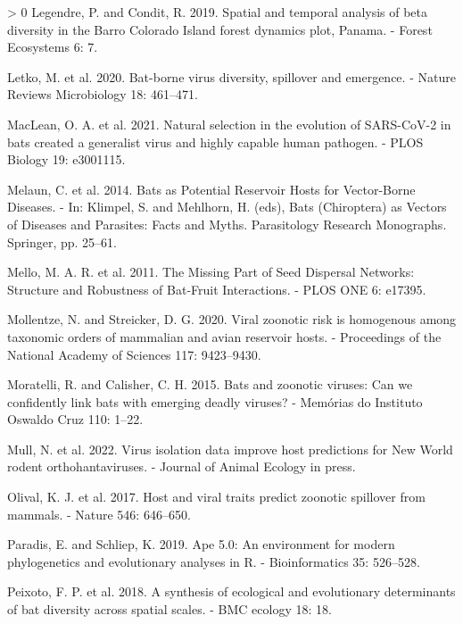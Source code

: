 \documentclass[11pt]{article}
\newlength{\cslhangindent}
\newenvironment{CSLReferences}[3] %
 {%
  \setlength{\parindent}{0pt}
  \ifodd #1 \everypar{\setlength{\hangindent}{\cslhangindent}}\ignorespaces\fi
  \ifnum #2 > 0
  \setlength{\parskip}{#2\baselineskip}
  \fi
 }%
 {}
\begin{document}
\begin{CSLReferences}{1}{0}
\leavevmode\hypertarget{ref-Legendre2019SpaTem}{}%
Legendre, P. and Condit, R. 2019. Spatial and temporal analysis of beta
diversity in the Barro Colorado Island forest dynamics plot, Panama. -
Forest Ecosystems 6: 7.

\leavevmode\hypertarget{ref-Letko2020BatVir}{}%
Letko, M. et al. 2020. Bat-borne virus diversity, spillover and
emergence. - Nature Reviews Microbiology 18: 461--471.

\leavevmode\hypertarget{ref-MacLean2021NatSel}{}%
MacLean, O. A. et al. 2021. Natural selection in the evolution of
SARS-CoV-2 in bats created a generalist virus and highly capable human
pathogen. - PLOS Biology 19: e3001115.

\leavevmode\hypertarget{ref-Melaun2014BatPot}{}%
Melaun, C. et al. 2014. Bats as Potential Reservoir Hosts for
Vector-Borne Diseases. - In: Klimpel, S. and Mehlhorn, H. (eds), Bats
(Chiroptera) as Vectors of Diseases and Parasites: Facts and Myths.
Parasitology Research Monographs. Springer, pp. 25--61.

\leavevmode\hypertarget{ref-Mello2011MisPar}{}%
Mello, M. A. R. et al. 2011. The Missing Part of Seed Dispersal
Networks: Structure and Robustness of Bat-Fruit Interactions. - PLOS ONE
6: e17395.

\leavevmode\hypertarget{ref-Mollentze2020VirZoo}{}%
Mollentze, N. and Streicker, D. G. 2020. Viral zoonotic risk is
homogenous among taxonomic orders of mammalian and avian reservoir
hosts. - Proceedings of the National Academy of Sciences 117:
9423--9430.

\leavevmode\hypertarget{ref-Moratelli2015BatZoo}{}%
Moratelli, R. and Calisher, C. H. 2015. Bats and zoonotic viruses: Can
we confidently link bats with emerging deadly viruses? - Memórias do
Instituto Oswaldo Cruz 110: 1--22.

\leavevmode\hypertarget{ref-Mull2022VirIso}{}%
Mull, N. et al. 2022. Virus isolation data improve host predictions for
New World rodent orthohantaviruses. - Journal of Animal Ecology in
press.

\leavevmode\hypertarget{ref-Olival2017HosVir}{}%
Olival, K. J. et al. 2017. Host and viral traits predict zoonotic
spillover from mammals. - Nature 546: 646--650.

\leavevmode\hypertarget{ref-Paradis2019ApeEnv}{}%
Paradis, E. and Schliep, K. 2019. Ape 5.0: An environment for modern
phylogenetics and evolutionary analyses in R. - Bioinformatics 35:
526--528.

\leavevmode\hypertarget{ref-Peixoto2018SynEco}{}%
Peixoto, F. P. et al. 2018. A synthesis of ecological and evolutionary
determinants of bat diversity across spatial scales. - BMC ecology 18:
18.


\end{CSLReferences}
\end{document}
